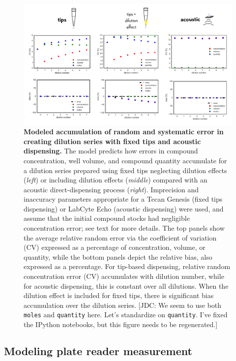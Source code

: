 \documentclass[aps,pre,twocolumn,nofootinbib,superscriptaddress,linenumbers]{revtex4-1}
\begin{document}
\begin{figure}[tb]
    \includegraphics[width=1.0\textwidth]{../figures/volumes-n-concentrations.pdf}

  \caption{{\bf Modeled accumulation of random and systematic error in creating dilution series with fixed tips and acoustic dispensing.}
  The model predicts how errors in compound concentration, well volume, and compound quantity accumulate for a dilution series prepared using fixed tips neglecting dilution effects (\emph{left}) or including dilution effects (\emph{middle}) compared with an acoustic direct-dispensing process (\emph{right}).
  Imprecision and inaccuracy parameters appropriate for a Tecan Genesis (fixed tips dispensing) or LabCyte Echo (acoustic dispensing) were used, and assume that the initial compound stocks had negligible concentration error; see text for more details.
  The top panels show the average relative random error via the coefficient of variation (CV) expressed as a percentage of concentration, volume, or quantity, while the bottom panels depict the relative bias, also expressed as a percentage.
  For tip-based dispensing, relative random concentration error (CV) accumulates with dilution number, while for acoustic dispensing, this is constant over all dilutions.
  When the dilution effect is included for fixed tips, there is significant bias accumulation over the dilution series.
  {\color{red}[JDC: We seem to use both {\tt moles} and {\tt quantity} here. Let's standardize on {\tt quantity}.  I've fixed the IPython notebooks, but this figure needs to be regenerated.]}
  }
  \label{fig:volumes-n-concentrations}
\end{figure}


\subsection*{Modeling plate reader measurement}
\end{document}

